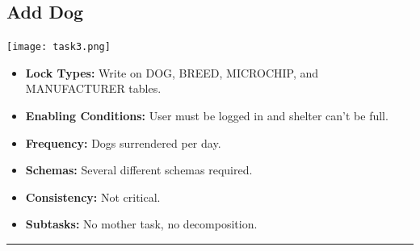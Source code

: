 \documentclass{article}
\begin{document}
\subsection{Add Dog}
\begin{center}
    \texttt{[image: task3.png]}
\end{center}
\begin{itemize}
    \item \textbf{Lock Types:} Write on DOG, BREED, MICROCHIP, and MANUFACTURER tables.
    \item \textbf{Enabling Conditions:} User must be logged in and shelter can't be full.
    \item \textbf{Frequency:} Dogs surrendered per day.
    \item \textbf{Schemas:} Several different schemas required.
    \item \textbf{Consistency:} Not critical.
    \item \textbf{Subtasks:} No mother task, no decomposition.
\end{itemize}
\noindent\rule{8cm}{0.4pt}
\end{document}
